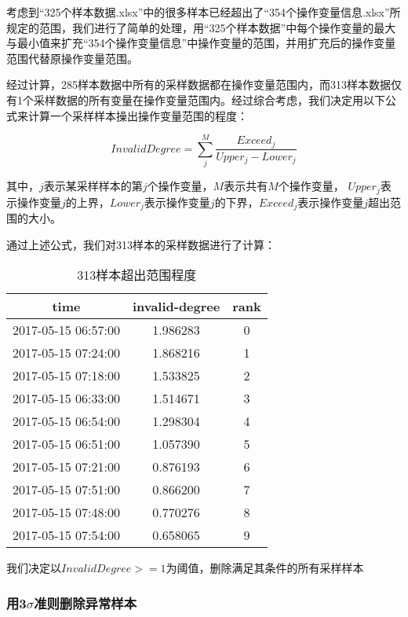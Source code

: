 \documentclass[bwprint]{gmcmthesis}
\begin{document}
考虑到“325个样本数据.xlsx”中的很多样本已经超出了“354个操作变量信息.xlsx”所规定的范围，我们进行了简单的处理，用“325个样本数据”中每个操作变量的最大与最小值来扩充“354个操作变量信息”中操作变量的范围，并用扩充后的操作变量范围代替原操作变量范围。

经过计算，285样本数据中所有的采样数据都在操作变量范围内，而313样本数据仅有1个采样数据的所有变量在操作变量范围内。经过综合考虑，我们决定用以下公式来计算一个采样样本操出操作变量范围的程度：

\begin{equation}
	InvalidDegree=\sum^M_j{\frac{Exceed_j}{Upper_j - Lower_j}}
	\label{eq:range-invalid-degree}
\end{equation}

其中，$j$表示某采样样本的第$j$个操作变量，$M$表示共有$M$个操作变量， $Upper_j$表示操作变量$j$的上界，$Lower_j$表示操作变量$j$的下界，$Exceed_j$表示操作变量$j$超出范围的大小。

通过上述公式，我们对313样本的采样数据进行了计算：

\begin{table}[!htbp]
	\caption{313样本超出范围程度}\label{tab:001} \centering
	\begin{tabular}{ccc}
	\toprule[1.5pt]
	time &  invalid-degree &  rank \\
	\midrule[1pt]
	2017-05-15 06:57:00 &        1.986283 &     0 \\
	2017-05-15 07:24:00 &        1.868216 &     1 \\
	2017-05-15 07:18:00 &        1.533825 &     2 \\
	2017-05-15 06:33:00 &        1.514671 &     3 \\
	2017-05-15 06:54:00 &        1.298304 &     4 \\
	2017-05-15 06:51:00 &        1.057390 &     5 \\
	2017-05-15 07:21:00 &        0.876193 &     6 \\
	2017-05-15 07:51:00 &        0.866200 &     7 \\
	2017-05-15 07:48:00 &        0.770276 &     8 \\
	2017-05-15 07:54:00 &        0.658065 &     9 \\
	\bottomrule[1.5pt]
\end{tabular}
\end{table}


我们决定以$InvalidDegree >= 1$为阈值，删除满足其条件的所有采样样本




\subsubsection{用3$\sigma$准则删除异常样本}
\end{document}

